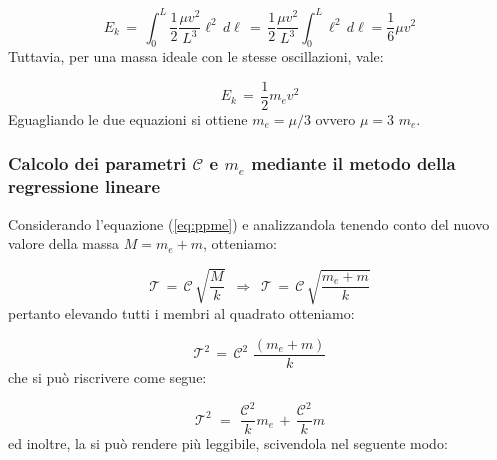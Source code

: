 \begin{equation*}
    E_k \, = \, \int_0^L \frac{1}{2} \frac{\mu v^2}{L^3} \ell^2 \, d\ell \, = \,
    \frac{1}{2} \frac{\mu v^2}{L^3} \int_0^L \ell^2 \, d\ell = \frac{1}{6} \mu v^2
\end{equation*}
%
Tuttavia, per una massa ideale con le stesse oscillazioni, vale:

\begin{equation*}
    E_k \, = \, \frac{1}{2} m_e v^2
\end{equation*}
%
Eguagliando le due equazioni si ottiene $m_e = \mu/3$ ovvero $\mu = 3\,\,m_e$. 

\subsubsection{Calcolo dei parametri $\mathcal{C}$ e $m_e$ mediante il metodo della regressione lineare}
Considerando l'equazione (\ref{eq:ppme}) e analizzandola tenendo conto del nuovo valore della massa $M = m_e + m$, otteniamo:

\begin{equation*}
	\mathcal{T} \,=\, \mathcal{C} \, \sqrt{\frac{M}{k}}	\,\,\,\Longrightarrow\,\,\, \mathcal{T} \,=\, \mathcal{C} \, \sqrt{\frac{m_e + m}{k}}
\end{equation*}
%
pertanto elevando tutti i membri al quadrato otteniamo:

\begin{equation*}
	\mathcal{T}^2 \,=\, \mathcal{C}^2 \,\, \frac{(m_e + m)}{k}
\end{equation*}
%
che si può riscrivere come segue:

\begin{equation}
	\mathcal{T}^2 \,\,=\,\, \frac{\mathcal{C}^2}{k} m_e \,+\, \frac{\mathcal{C}^2}{k} m
	\label{eq:mCspezzati}
\end{equation}
%
ed inoltre, la si può rendere più leggibile, scivendola nel seguente modo:

